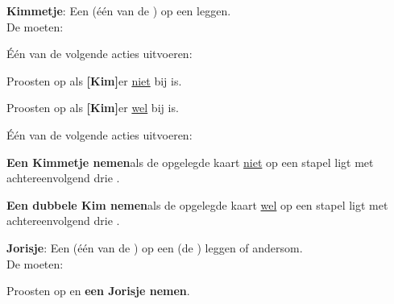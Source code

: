 \vervolgLijst{}
    \item \label{zet:kim} \textbf{Kimmetje}: Een  (\'e\'en van de ) op een  leggen. \\De \andereSpelers moeten:
    \puntLijst{}
    \item Één van de volgende acties uitvoeren:
        \numeriekeLijst{}
            \item Proosten op  als \textbf{[Kim]}\footnotemark[3] er \ul{niet} bij is.
            \item Proosten op  als \textbf{[Kim]}\footnotemark[3] er \ul{wel} bij is.
        \eindNumeriekeLijst{}
    \item Één van de volgende acties uitvoeren:
        \numeriekeLijst{}
            \item \textbf{Een Kimmetje nemen}\footnotemark[2] als de opgelegde kaart \ul{niet} op een stapel ligt met \\achtereenvolgend drie .
            \item \textbf{Een dubbele Kim nemen}\footnotemark[4] als de opgelegde kaart \ul{wel} op een stapel ligt met \\achtereenvolgend drie .
        \eindNumeriekeLijst{}
    \eindPuntLijst{}
\eindLijst{}  


\newpage
{}
\label{sec:zettenLang_2}

\vervolgLijst{}
    \item \label{zet:joris} \textbf{Jorisje}: Een  (\'e\'en van de ) op een  (de ) leggen of andersom. \\De \andereSpelers moeten:
    \puntLijst{}
        \item Proosten op  en \textbf{een Jorisje nemen}\footnotemark[1].
    \eindPuntLijst{}
\eindLijst{} 


